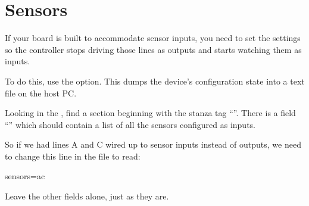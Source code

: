 \documentclass[letterpaper,twoside,onecolumn,openright,final]{memoir}
\begin{document}
\section{Sensors}\label{sec:sensors}

If your board is built to accommodate sensor inputs, you need to set the 
settings so the controller stops driving those lines as outputs and starts watching them as
inputs.

To do this, use the  option.  This dumps the device's
configuration state into a text file on the host PC.


Looking in the , find a section beginning with the stanza tag
``''.
There is a field ``'' which should contain a list of all the sensors 
configured as inputs.  

So if we had lines A and C wired up to sensor inputs instead of  outputs, we need to 
change this line in the  file to read:

\begin{SourceCode}
sensors=ac
\end{SourceCode}

Leave the other fields alone, just as they are.
\end{document}
